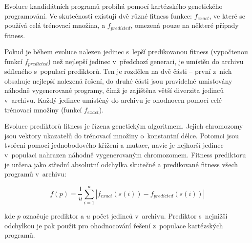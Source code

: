 Evoluce kandidátních programů probíhá pomocí kartézského genetického programování. Ve skutečnosti existují dvě různé fitness funkce: $f_{\mathit{exact}}$, ve které se používá celá trénovací množina, a $f_{\mathit{predicted}}$, omezená pouze na některé případy fitness.




Pokud je během evoluce nalezen jedinec s~lepší predikovanou fitness (vypočtenou funkcí $f_{\mathit{predicted}}$) než nejlepší jedinec v~předchozí generaci, je umístěn do archivu sdíleného s~populací prediktorů. Ten je rozdělen na dvě části -- první z~nich obsahuje nejlepší nalezená řešení, do druhé části jsou pravidelně umisťovány náhodně vygenerované programy, čímž je zajištěna větší diverzita jedinců v~archivu. Každý jedinec umístěný do archivu je ohodnocen pomocí celé trénovací množiny (funkcí $f_{\mathit{exact}}$).

Evoluce prediktorů fitness je řízena genetickým algoritmem. Jejich chromozomy jsou vektory ukazatelů do trénovací množiny o~konstantní délce. Potomci jsou tvořeni pomocí jednobodového křížení a mutace, navíc je nejhorší jedinec v~populaci nahrazen náhodně vygenerovaným chromozomem. Fitness prediktoru je určena jako střední absolutní odchylka skutečné a predikované fitness všech programů v~archivu:

\begin{equation}
    \label{eqFpredictorSR}
    f \left( p \right) = \frac{1}{u} \sum\limits_{i=1}^{u} \left| f_{\mathit{exact}} \left( s \left( i \right) \right) - f_{\mathit{predicted}} \left( s \left( i \right) \right) \right|
\end{equation}

\noindent{}kde $p$ označuje prediktor a $u$ počet jedinců v~archivu. Prediktor s~nejnižší odchylkou je pak použit pro ohodnocování řešení z~populace kartézských programů.

